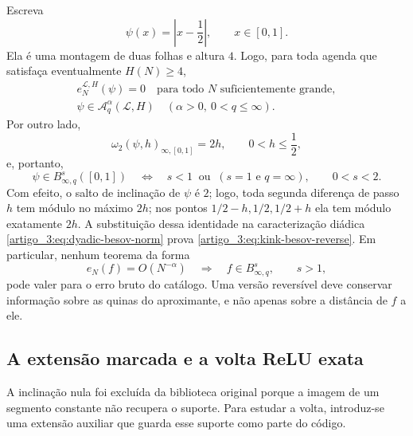 \documentclass[12pt,a4paper]{article}
\theoremstyle{preciso}
\theoremstyle{definition}
\newcommand{\Library}{\mathcal{L}}
\theoremstyle{preciso}
\theoremstyle{preciso}
\theoremstyle{preciso}
\theoremstyle{preciso}
\theoremstyle{definition}
\theoremstyle{preciso}
\theoremstyle{definition}
\theoremstyle{preciso}
\theoremstyle{preciso}
\theoremstyle{definition}
\begin{document}
Escreva
\begin{equation}
 \psi(x)=\left|x-\frac12\right|,
 \qquad x\in[0,1].
 \label{artigo_3:eq:reverse-kink}
\end{equation}
Ela é uma montagem de duas folhas e altura $4$. Logo, para toda agenda que
satisfaça eventualmente $H(N)\ge4$,
\begin{equation}
 \begin{gathered}
 e_N^{\Library,H}(\psi)=0
 \quad\text{para todo $N$ suficientemente grande},\\
 \psi\in\mathscr A_q^\alpha(\Library,H)
 \quad(\alpha>0,\ 0<q\le\infty).
 \end{gathered}
 \label{artigo_3:eq:kink-zero-raw-error}
\end{equation}
Por outro lado,
\begin{equation}
 \omega_2(\psi,h)_{\infty,[0,1]}=2h,
 \qquad 0<h\le\frac12,
 \label{artigo_3:eq:kink-exact-modulus-reverse}
\end{equation}
e, portanto,
\begin{equation}
 \psi\in B^s_{\infty,q}([0,1])
 \quad\Longleftrightarrow\quad
 s<1\ \text{ ou }\ (s=1\text{ e }q=\infty),
 \qquad 0<s<2.
 \label{artigo_3:eq:kink-besov-reverse}
\end{equation}
Com efeito, o salto de inclinação de $\psi$ é $2$; logo, toda segunda diferença
de passo $h$ tem módulo no máximo $2h$; nos pontos
$1/2-h,1/2,1/2+h$ ela tem módulo exatamente $2h$. A substituição dessa identidade
na caracterização diádica \eqref{artigo_3:eq:dyadic-besov-norm} prova
\eqref{artigo_3:eq:kink-besov-reverse}. Em particular, nenhum
teorema da forma
\begin{equation}
 e_N(f)=O(N^{-\alpha})\quad\Longrightarrow\quad
 f\in B^s_{\infty,q},
 \qquad s>1,
 \label{artigo_3:eq:forbidden-unregularized-converse}
\end{equation}
pode valer para o erro bruto do catálogo. Uma versão reversível deve conservar
informação sobre as quinas do aproximante, e não apenas sobre a distância de
$f$ a ele.

\subsection{A extensão marcada e a volta ReLU exata}

A inclinação nula foi
excluída da biblioteca original porque a imagem de um segmento constante não
recupera o suporte. Para estudar a volta, introduz-se uma extensão auxiliar
que guarda esse suporte como parte do código.
\end{document}

